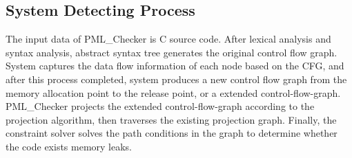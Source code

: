 
\subsection{System Detecting Process}


The input data of PML\_Checker is C source code. After lexical analysis and syntax analysis, abstract syntax tree generates the original control flow graph. System captures the data flow information of each node based on the CFG, and after this process completed, system produces a new control flow graph from the memory allocation point to the release point, or a extended control-flow-graph. PML\_Checker projects the extended control-flow-graph according to the projection algorithm, then traverses the existing projection graph. Finally, the constraint solver solves the path conditions in the graph to determine whether the code exists memory leaks.

